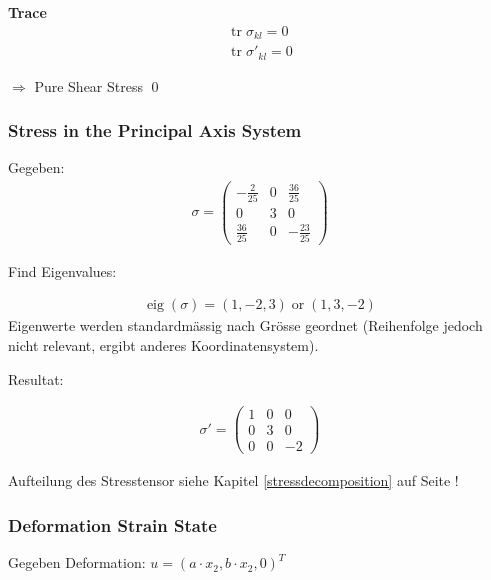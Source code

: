 \textbf{Trace}\\

\begin{align}
	\operatorname{tr}\sigma_{kl}=0 \\
	\operatorname{tr}\sigma'_{kl}=0 
\end{align}

$\Rightarrow$ Pure Shear Stress
\qed
\subsubsection{Stress in the Principal Axis System}
Gegeben:
\begin{align}
	\sigma=\begin{pmatrix}
		-\frac{2}{25} & 0 & \frac{36}{25} \\
		0 & 3 & 0 \\
		\frac{36}{25}& 0 & -\frac{23}{25}
	\end{pmatrix}
\end{align}

Find Eigenvalues:

\begin{align}
	\operatorname{eig}(\sigma)=\left(1,-2, 3\right) \operatorname{or}
	\left(1,3,-2\right)
\end{align}
Eigenwerte werden standardmässig nach Grösse geordnet (Reihenfolge jedoch nicht
relevant, ergibt anderes Koordinatensystem).


Resultat:

\begin{align}
	\sigma'=\begin{pmatrix}
		1 & 0 & 0 \\
		0 & 3 & 0 \\
		0 & 0 & -2
	\end{pmatrix}
\end{align}

Aufteilung des Stresstensor siehe Kapitel \ref{stressdecomposition} auf Seite
\pageref{stressdecomposition}!

\subsubsection{Deformation Strain State}\label{9.3} %
Gegeben Deformation: $u = (a \cdot x_2, b \cdot x_2, 0)^T$

